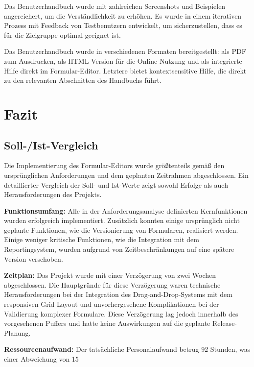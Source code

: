 \documentclass[a4paper,11pt]{article}
\begin{document}
Das Benutzerhandbuch wurde mit zahlreichen Screenshots und Beispielen angereichert, um die Verständlichkeit zu erhöhen. Es wurde in einem iterativen Prozess mit Feedback von Testbenutzern entwickelt, um sicherzustellen, dass es für die Zielgruppe optimal geeignet ist.

Das Benutzerhandbuch wurde in verschiedenen Formaten bereitgestellt: als PDF zum Ausdrucken, als HTML-Version für die Online-Nutzung und als integrierte Hilfe direkt im Formular-Editor. Letztere bietet kontextsensitive Hilfe, die direkt zu den relevanten Abschnitten des Handbuchs führt.

\section{Fazit}
\subsection{Soll-/Ist-Vergleich}
Die Implementierung des Formular-Editors wurde größtenteils gemäß den ursprünglichen Anforderungen und dem geplanten Zeitrahmen abgeschlossen. Ein detaillierter Vergleich der Soll- und Ist-Werte zeigt sowohl Erfolge als auch Herausforderungen des Projekts.

\textbf{Funktionsumfang:} Alle in der Anforderungsanalyse definierten Kernfunktionen wurden erfolgreich implementiert. Zusätzlich konnten einige ursprünglich nicht geplante Funktionen, wie die Versionierung von Formularen, realisiert werden. Einige weniger kritische Funktionen, wie die Integration mit dem Reportingsystem, wurden aufgrund von Zeitbeschränkungen auf eine spätere Version verschoben.

\textbf{Zeitplan:} Das Projekt wurde mit einer Verzögerung von zwei Wochen abgeschlossen. Die Hauptgründe für diese Verzögerung waren technische Herausforderungen bei der Integration des Drag-and-Drop-Systems mit dem responsiven Grid-Layout und unvorhergesehene Komplikationen bei der Validierung komplexer Formulare. Diese Verzögerung lag jedoch innerhalb des vorgesehenen Puffers und hatte keine Auswirkungen auf die geplante Release-Planung.

\textbf{Ressourcenaufwand:} Der tatsächliche Personalaufwand betrug 92 Stunden, was einer Abweichung von 15%
\end{document}
